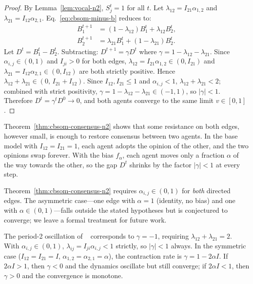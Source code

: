 \begin{proof}
  By Lemma~\ref{lem:vocal-n2}, $S_j^t=1$ for all $t$.
  Let $\lambda_{12}=I_{21}\alpha_{1,2}$ and
  $\lambda_{21}=I_{12}\alpha_{2,1}$.
  Eq.~\eqref{eq:cbsom-minus-b} reduces to:
  \begin{align*}
    B_1^{t+1}&=(1-\lambda_{12})B_1^t+\lambda_{12}B_2^t,\\
    B_2^{t+1}&=\lambda_{21}B_1^t+(1-\lambda_{21})B_2^t.
  \end{align*}
  Let $D^t=B_1^t-B_2^t$.  Subtracting:
  $D^{t+1}=\gamma D^t$ where
  $\gamma=1-\lambda_{12}-\lambda_{21}$.
  Since $\alpha_{i,j}\in(0,1)$ and $I_{ji}>0$ for both edges,
  $\lambda_{12}=I_{21}\alpha_{1,2}\in(0,I_{21})$ and
  $\lambda_{21}=I_{12}\alpha_{2,1}\in(0,I_{12})$ are both strictly
  positive.  Hence $\lambda_{12}+\lambda_{21}\in(0,\,I_{21}+I_{12})$.
  Since $I_{12},I_{21}\le 1$ and $\alpha_{i,j}<1$,
  $\lambda_{12}+\lambda_{21}<2$; combined with strict positivity,
  $\gamma=1-\lambda_{12}-\lambda_{21}\in(-1,1)$, so $|\gamma|<1$.
  Therefore $D^t=\gamma^t D^0\to 0$, and both agents converge to
  the same limit $v\in[0,1]$.
\end{proof}

Theorem~\ref{thm:cbsom-consensus-n2} shows that some resistance on both
edges, however small, is enough to restore consensus between two agents.
In the base model with $I_{12}=I_{21}=1$, each agent adopts the opinion
of the other, and the two opinions swap forever. With the bias $f_\alpha$,
each agent moves only a fraction $\alpha$ of the way towards the other,
so the gap $D^t$ shrinks by the factor $|\gamma|<1$ at every step.

\begin{remark}\label{rem:n2-asymmetric}
  Theorem~\ref{thm:cbsom-consensus-n2} requires $\alpha_{i,j}\in(0,1)$
  for \emph{both} directed edges.  The asymmetric case---one edge with
  $\alpha=1$ (identity, no bias) and one with $\alpha\in(0,1)$---falls
  outside the stated hypotheses but is conjectured to converge; we
  leave a formal treatment for future work.
\end{remark}

\begin{remark}[Recovery of the $n=2$ pathology]
\label{rem:n2-recovery}
  The period-2 oscillation of \SOMminus~\cite{aranda2024sound}
  corresponds to $\gamma=-1$, requiring
  $\lambda_{12}+\lambda_{21}=2$.
  With $\alpha_{i,j}\in(0,1)$, $\lambda_{ij}=I_{ji}\alpha_{i,j}<1$
  strictly, so $|\gamma|<1$ always.
  In the symmetric case ($I_{12}=I_{21}=I$,
  $\alpha_{1,2}=\alpha_{2,1}=\alpha$),
  the contraction rate is $\gamma=1-2\alpha I$.
  If $2\alpha I>1$, then $\gamma<0$ and the dynamics oscillate but still
  converge; if $2\alpha I<1$, then $\gamma>0$ and the convergence is
  monotone.
\end{remark}


